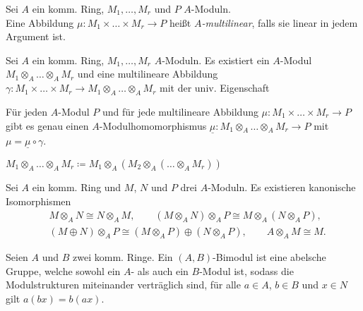 \documentclass{cheat-sheet}
\begin{document}

\begin{defn}
  Sei $A$ ein komm. Ring, $M_1, \ldots, M_r$ und $P$ $A$-Moduln. \\
  Eine Abbildung $\mu : M_1 \times \ldots \times M_r \to P$ heißt \emph{$A$-multilinear}, falls sie linear in jedem Argument ist.
\end{defn}

\begin{prop}
  Sei $A$ ein komm. Ring, $M_1, \ldots, M_r$ $A$-Moduln.
  Es existiert ein $A$-Modul $M_1 \otimes_A \ldots \otimes_A M_r$ und eine multilineare Abbildung $\gamma : M_1 \times \ldots \times M_r \to M_1 \otimes_A \ldots \otimes_A M_r$ mit der univ. Eigenschaft

  \hfill\begin{minipage}{0.95 \linewidth}
    Für jeden $A$-Modul $P$ und für jede multilineare Abbildung $\mu : M_1 \times \ldots \times M_r \to P$ gibt es genau einen $A$-Modulhomomorphismus $\underline{\mu} : M_1 \otimes_A \ldots \otimes_A M_r \to P$ mit $\mu = \underline{\mu} \circ \gamma$.
  \end{minipage}
\end{prop}

\begin{konstr}
  $M_1 \otimes_A \ldots \otimes_A M_r \coloneqq M_1 \otimes_A (M_2 \otimes_A (\ldots \otimes_A M_r))$
\end{konstr}


\begin{prop}
  Sei $A$ ein komm. Ring und $M$, $N$ und $P$ drei $A$-Moduln.
  Es existieren kanonische Isomorphismen
  \begin{align*}
    & M \otimes_A N \cong N \otimes_A M, \qquad
    (M \otimes_A N) \otimes_A P \cong M \otimes_A (N \otimes_A P), \\
    & (M \oplus N) \otimes_A P \cong (M \otimes_A P) \oplus (N \otimes_A P), \qquad
    A \otimes_A M \cong M.
  \end{align*}
\end{prop}

\begin{defn}
  Seien $A$ und $B$ zwei komm. Ringe.
  Ein $(A, B)$-Bimodul ist eine abelsche Gruppe, welche sowohl ein $A$- als auch ein $B$-Modul ist, sodass die Modulstrukturen miteinander verträglich sind, \dh{} für alle $a \in A$, $b \in B$ und $x \in N$ gilt $a (bx) = b (ax)$.
\end{defn}
\end{document}
